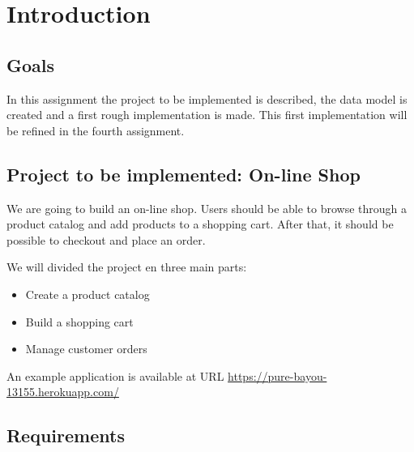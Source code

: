 \documentclass[12pt]{article} %
\newcommand{\herokuurl}[1]{\url{https://pure-bayou-13155.herokuapp.com/#1}}%
\begin{document}

\tableofcontents %

\newpage %


\section {Introduction}
\subsection {Goals }

In this assignment the project to be implemented is described, the data model is created and  a first rough implementation is made. This first implementation  will be refined in the fourth assignment. 


\subsection{Project to be implemented: On-line Shop} %

We are going to build an on-line shop. Users should be able to browse through a product catalog and add products to a shopping cart. After that, it should be possible to checkout and place an order. 

We will divided the project en three main parts: 

\begin{itemize}
 \item Create a product catalog
 \item  Build a shopping cart
 \item Manage customer orders
\end{itemize}

An example application is available at URL  \herokuurl{}

\subsection{Requirements}
\end{document}
